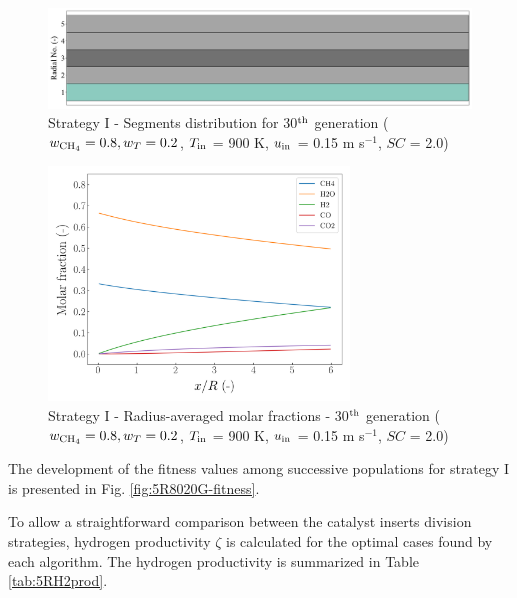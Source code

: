 \documentclass[preprint,12pt]{elsarticle}
\begin{document}
\begin{figure}[h!]
\centering
\includegraphics[width=120mm]{results/segments/5seg/80C20T/seg.png}
\caption{\label{fig:30L6040G1-TField} Strategy I - Segments distribution for 30$^{\rm{th}}$ generation ($w_{\rm{CH_4}} = 0.8, w_T = 0.2$, $T_{\rm{in}}$ = 900 K, $u_{\rm{in}}$ = 0.15 m s$^{-1}$, $SC$ = 2.0)}
\end{figure}

\begin{figure}[h!]
\centering
\includegraphics[width=80mm]{results/5/80C_20T/GEN30-AVG.png}
\caption{\label{fig:5R8020G30-avg} Strategy I - Radius-averaged molar fractions -  30$^{\rm{th}}$ generation ($w_{\rm{CH_4}} = 0.8, w_T = 0.2$, $T_{\rm{in}}$ = 900 K, $u_{\rm{in}}$ = 0.15 m s$^{-1}$, $SC$ = 2.0)}
\end{figure}


The development of the fitness values among successive populations for strategy I is presented in Fig. \ref{fig:5R8020G-fitness}. 


To allow a straightforward comparison between the catalyst inserts division strategies, hydrogen productivity $\zeta$ is calculated for the optimal cases found by each algorithm. The hydrogen productivity is summarized in Table \ref{tab:5RH2prod}. 
\end{document}
